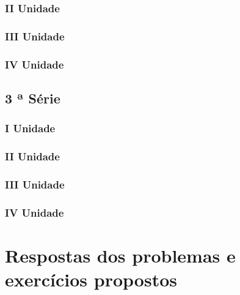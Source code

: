\documentclass[12pt,a4paper]{book}
\begin{document}
		\subsection{II Unidade}
		\subsection{III Unidade}
		\subsection{IV Unidade}
		
	\section{3 ª Série}
		\subsection{I Unidade}
		\subsection{II Unidade}
		\subsection{III Unidade}
		\subsection{IV Unidade}

\chapter{Respostas dos problemas e exercícios propostos}
\end{document}
